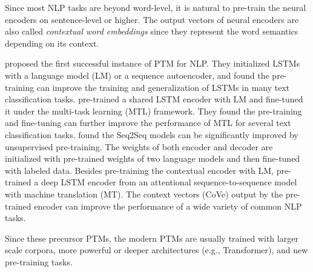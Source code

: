 \documentclass[fleqn]{SCYE-arxiv}
\begin{document}
\begin{multicols}{2}
Since most NLP tasks are beyond word-level, it is natural to pre-train the neural encoders on sentence-level or higher. The output vectors of neural encoders are also called \textit{contextual word embeddings} since they represent the word semantics depending on its context.

\citet{dai2015semi} proposed the first successful instance of PTM for NLP. They initialized LSTMs with a language model (LM) or a sequence autoencoder, and found the pre-training can improve the training and generalization of LSTMs in many text classification tasks.
\citet{liu2016recurrent} pre-trained a shared LSTM encoder with LM and fine-tuned it under the multi-task learning (MTL) framework. They found the pre-training and fine-tuning can further improve the performance of MTL for several text classification tasks. \citet{ramachandran2017unsupervised} found the Seq2Seq models can be significantly improved by unsupervised pre-training. The weights of both encoder and decoder are initialized with pre-trained weights of two language models and then fine-tuned with labeled data.
Besides pre-training the contextual encoder with LM, \citet{mccan2017learn} pre-trained a deep LSTM encoder from an attentional sequence-to-sequence model with machine translation (MT). The context vectors (CoVe) output by the pre-trained encoder can improve the performance of a wide variety of common NLP tasks.

Since these precursor PTMs, the modern PTMs are usually trained with larger scale corpora, more powerful or deeper architectures (e.g., Transformer), and new pre-training tasks.


\end{multicols}
\end{document}
